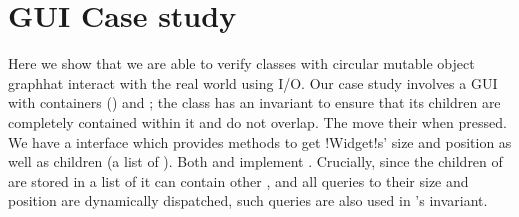\section{GUI Case study}
\label{s:case-study}

%
%
%
%
%
%
%
Here we show that we are able to verify classes with circular mutable object graphhat interact with the real world using I/O.
Our case study involves a GUI with containers (\Q@SafeMovable@s) and \Q@Button@s;
the \Q@SafeMovable@ class has an invariant to ensure that its children are completely contained within it and do not overlap. The \Q@Button@s move their \Q@SafeMovable@ when pressed. We have a \Q@Widget@ interface which provides methods to get \Q!Widget!s' size and position as well as children (a list of \Q@Widget@s). Both \Q@SafeMovable@s and \Q@Button@s implement \Q@Widget@. Crucially, since the children of \Q@SafeMovable@ are stored in a list of \Q@Widget@s it can contain other \Q@SafeMovable@s, and all queries to their size and position are dynamically dispatched, such queries are also used in \Q@SafeMovable@'s invariant.
